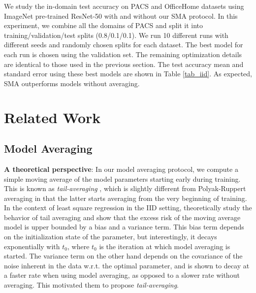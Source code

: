 \documentclass{article}
\begin{document}
We study the in-domain test accuracy on PACS and OfficeHome datasets using ImageNet pre-trained ResNet-50 with and without our SMA protocol. In this experiment, we combine all the domains of PACS and split it into training/validation/test splits (0.8/0.1/0.1). We run 10 different runs with different seeds and randomly chosen splits for each dataset. The best model for each run is chosen using the validation set. The remaining optimization details are identical to those used in the previous section. The test accuracy mean and standard error using these best models are shown in Table \ref{tab_iid}. As expected, SMA outperforms models without averaging.


\section{Related Work}
\label{sec_related_work}

\subsection{Model Averaging}
\vspace{-7pt}
\label{sec_relatedw_ma_models}

\textbf{A theoretical perspective}: In our model averaging protocol, we compute a simple moving average of the model parameters starting early during training. This is known as \textit{tail-averaging} \cite{jain2018parallelizing}, which is slightly different from Polyak-Ruppert averaging \cite{polyak1992acceleration} in that the latter starts averaging from the very beginning of training. 
In the context of least square regression in the IID setting, \cite{jain2018parallelizing} theoretically study the behavior of tail averaging and show that the excess risk of the moving average model is upper bounded by a bias and a variance term. This bias term depends on the initialization state of the parameter, but interestingly, it decays exponentially with $t_0$, where $t_0$ is the iteration at which model averaging is started. The variance term on the other hand depends on the covariance of the noise inherent in the data w.r.t. the optimal parameter, and is shown to decay at a faster rate when using model averaging, as opposed to a slower rate without averaging. This motivated them to propose \textit{tail-averaging}.
 
\end{document}
